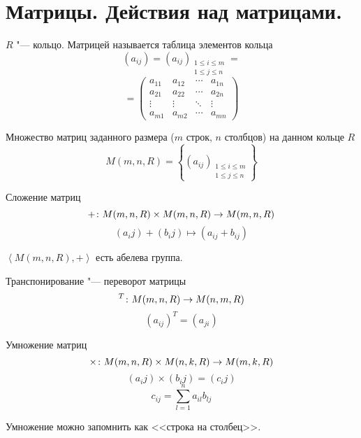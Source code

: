 \section{Матрицы. Действия над матрицами.}

\begin{Def}
$R$ "--- кольцо. Матрицей называется таблица элементов кольца
$$(a_{ij}) = (a_{ij})_{\substack{1 \leqslant i \leqslant m \\ 1 \leqslant j \leqslant n}} = $$
$$ = \left(\begin{matrix}
a_{11} & a_{12} & \cdots & a_{1n} \\
a_{21} & a_{22} & \cdots & a_{2n} \\
\vdots & \vdots & \ddots & \vdots \\
a_{m1} & a_{m2} & \cdots & a_{mn}
\end{matrix}\right)$$
\end{Def}

\begin{Def}
Множество матриц заданного размера ($m$ строк, $n$ столбцов) на данном кольце $R$
$$M(m, n, R) = \left\{(a_{ij})_{\substack{1 \leqslant i \leqslant m \\ 1 \leqslant j \leqslant n}}\right\}$$
\end{Def}

\begin{Def}
Сложение матриц
$$+\colon M(m, n, R) \times M(m, n, R) \rightarrow M(m, n, R)$$
$$(a_ij) + (b_ij) \mapsto (a_{ij} + b_{ij})$$
\end{Def}

\begin{lemma}
$\left<M(m, n, R), +\right>$ есть абелева группа.
\end{lemma}

\begin{Def}
Транспонирование "--- переворот матрицы
$${}^T\colon M(m, n, R) \rightarrow M(n, m, R)$$
$$(a_{ij})^T = (a_{ji})$$
\end{Def}

\begin{Def}
Умножение матриц
$$\times\colon M(m, n, R) \times M(n, k, R) \rightarrow M(m, k, R)$$
$$(a_ij) \times (b_ij) = (c_ij)$$
$$c_{ij} = \sum_{l=1}^{n} a_{il}b_{lj}$$
\end{Def}

Умножение можно запомнить как <<строка на столбец>>.

